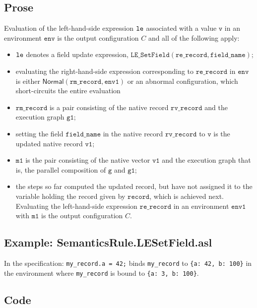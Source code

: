\documentclass{book}
\newcommand\ProseOrAbnormal[0]{or an abnormal configuration, which short-circuits the entire evaluation}
\newcommand\Normal[0]{\textsf{Normal}}
\newcommand\env[0]{\texttt{env}}
\newcommand\envone[0]{\texttt{env1}}
\newcommand\vg[0]{\texttt{g}}
\newcommand\vv[0]{\texttt{v}}
\newcommand\vvone[0]{\texttt{v1}}
\newcommand\vmone[0]{\texttt{m1}}
\newcommand\vgone[0]{\texttt{g1}}
\newcommand\fieldname[0]{\texttt{field\_name}}
\newcommand\record[0]{\texttt{record}}
\newcommand\rerecord[0]{\texttt{re\_record}}
\newcommand\rmrecord[0]{\texttt{rm\_record}}
\newcommand\rvrecord[0]{\texttt{rv\_record}}
\begin{document}
  \subsection{Prose}
    Evaluation of the left-hand-side expression $\texttt{le}$ associated with a
    value $\vv$ in an environment $\env$ is the output configuration $C$
    and all of the following apply:
    \begin{itemize}
    \item $\texttt{le}$ denotes a field update expression, $\texttt{LE\_SetField}(\rerecord, \fieldname)$;
    \item evaluating the right-hand-side expression corresponding to $\rerecord$
    in $\env$ is either $\Normal(\rmrecord, \envone)$ \ProseOrAbnormal
    \item $\rmrecord$ is a pair consisting of the native record $\rvrecord$ and
    the execution graph $\vgone$;
    \item setting the field $\fieldname$ in the native record $\rvrecord$ to $\vv$
    is the updated native record $\vvone$;
    \item $\vmone$ is the pair consisting of the native vector $\vvone$ and the
    execution graph that is, the parallel composition of $\vg$ and $\vgone$;
    \item the steps so far computed the updated record, but have not assigned it to
    the variable holding the record given by $\record$, which is achieved next.
    Evaluating the left-hand-side expression $\rerecord$ in an environment $\envone$ with $\vmone$
    is the output configuration $C$.
  \end{itemize}

    \subsection{Example: SemanticsRule.LESetField.asl}
    In the specification:
    \texttt{my\_record.a = 42;} binds \texttt{my\_record} to \texttt{\{a: 42, b: 100\}} in the environment where \texttt{my\_record} is bound to \texttt{\{a: 3, b: 100\}}.

  \subsection{Code}
\end{document}

